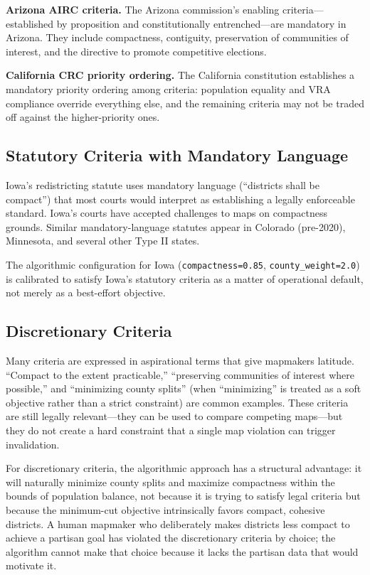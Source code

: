 \textbf{Arizona AIRC criteria.} The Arizona commission's enabling criteria---established by proposition and constitutionally entrenched---are mandatory in Arizona. They include compactness, contiguity, preservation of communities of interest, and the directive to promote competitive elections.

\textbf{California CRC priority ordering.} The California constitution establishes a mandatory priority ordering among criteria: population equality and VRA compliance override everything else, and the remaining criteria may not be traded off against the higher-priority ones.

\subsection{Statutory Criteria with Mandatory Language}

Iowa's redistricting statute uses mandatory language (``districts shall be compact'') that most courts would interpret as establishing a legally enforceable standard. Iowa's courts have accepted challenges to maps on compactness grounds. Similar mandatory-language statutes appear in Colorado (pre-2020), Minnesota, and several other Type II states.

The algorithmic configuration for Iowa (\texttt{compactness=0.85}, \texttt{county\_weight=2.0}) is calibrated to satisfy Iowa's statutory criteria as a matter of operational default, not merely as a best-effort objective.

\subsection{Discretionary Criteria}

Many criteria are expressed in aspirational terms that give mapmakers latitude. ``Compact to the extent practicable,'' ``preserving communities of interest where possible,'' and ``minimizing county splits'' (when ``minimizing'' is treated as a soft objective rather than a strict constraint) are common examples. These criteria are still legally relevant---they can be used to compare competing maps---but they do not create a hard constraint that a single map violation can trigger invalidation.

For discretionary criteria, the algorithmic approach has a structural advantage: it will naturally minimize county splits and maximize compactness within the bounds of population balance, not because it is trying to satisfy legal criteria but because the minimum-cut objective intrinsically favors compact, cohesive districts. A human mapmaker who deliberately makes districts less compact to achieve a partisan goal has violated the discretionary criteria by choice; the algorithm cannot make that choice because it lacks the partisan data that would motivate it.


